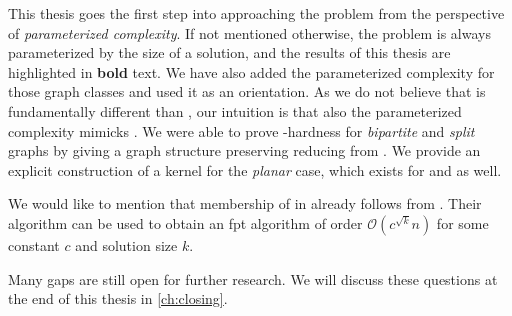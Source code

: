 This thesis goes the first step into approaching the problem from the perspective of \textit{parameterized complexity}.
If not mentioned otherwise, the problem is always parameterized by the size of a solution, and the results of this thesis are highlighted in \textbf{bold} text.
We have also added the parameterized complexity for those graph classes and used it as an orientation.
As we do not believe that \sdoms is fundamentally different than \doms, our intuition is that also the parameterized complexity mimicks \sdoms. 
We were able to prove \WTWO-hardness for \textit{bipartite} and \textit{split} graphs by giving a graph structure preserving reducing from \doms. We provide an explicit construction of a kernel for the \textit{planar} case, which exists for \doms \cite{Alber2004} and \tdoms \cite{Garnero2019} as well.

We would like to mention that membership of \psdom in \FPT already follows from \cite{Alber2002}.
Their algorithm \pdomp can be used to obtain an fpt algorithm of order $\mathcal{O}(c^{\sqrt{k}}n)$ for some constant $c$ and solution size $k$.

Many gaps are still open for further research.
We will discuss these questions at the end of this thesis in \cref{ch:closing}.

